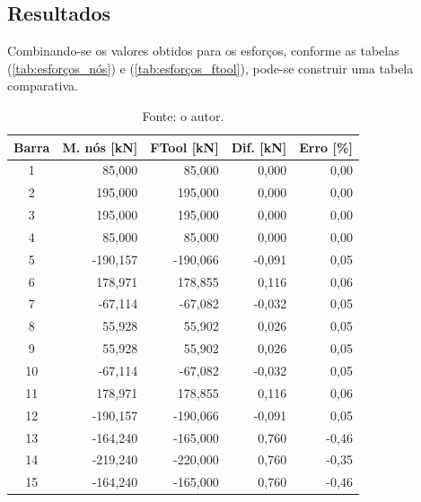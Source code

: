 \documentclass[a4paper, 12pt]{article} %
\begin{document}
\subsection{Resultados}

Combinando-se os valores obtidos para os esforços, conforme as tabelas (\ref{tab:esforços_nós}) e (\ref{tab:esforços_ftool}), pode-se construir uma tabela comparativa.

\begin{table}[!ht]
    \centering
    \caption{Tabela comparativa com os dados obtidos pelas duas metodologias. }
    \begin{tabular}{crrrr}
        \hline\hline
        Barra & M. nós [\unit{kN}] & FTool [\unit{kN}] & Dif. [\unit{kN}] & Erro 
        [\%] \\
        \hline\hline
        1     & 85,000      & 85,000     & 0,000          & 0,00     \\
        \hline
        2     & 195,000     & 195,000    & 0,000          & 0,00     \\
        \hline
        3     & 195,000     & 195,000    & 0,000          & 0,00     \\
        \hline
        4     & 85,000      & 85,000     & 0,000          & 0,00     \\
        \hline
        5     & -190,157    & -190,066   & -0,091         & 0,05     \\
        \hline
        6     & 178,971     & 178,855    & 0,116          & 0,06     \\
        \hline
        7     & -67,114     & -67,082    & -0,032         & 0,05     \\
        \hline
        8     & 55,928      & 55,902     & 0,026          & 0,05     \\
        \hline
        9     & 55,928      & 55,902     & 0,026          & 0,05     \\
        \hline
        10    & -67,114     & -67,082    & -0,032         & 0,05     \\
        \hline
        11    & 178,971     & 178,855    & 0,116          & 0,06     \\
        \hline
        12    & -190,157    & -190,066   & -0,091         & 0,05     \\
        \hline
        13    & -164,240    & -165,000   & 0,760          & -0,46    \\
        \hline
        14    & -219,240    & -220,000   & 0,760          & -0,35    \\
        \hline
        15    & -164,240    & -165,000   & 0,760          & -0,46    \\
        \hline\hline
    \end{tabular}
    \caption*{Fonte: o autor.}    
    \label{tab:comparativo}
\end{table}
\end{document}
